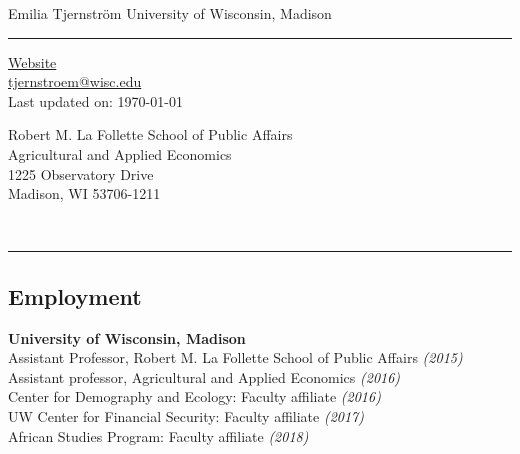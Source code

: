 \documentclass[11pt]{article}
\begin{document}
\begin{center}
\Large \sc Emilia Tjernstr\"{o}m \hfill University of Wisconsin, Madison \\
\end{center}
\vspace{-.3cm}
\noindent\rule{\textwidth}{1pt}
\parbox[t]{.45\textwidth}{\begin{flushleft}
    \vspace{-.5cm}
    \begin{footnotesize}  
    \href{https://www.lafollette.wisc.edu/sites/tjernstrom/}{Website} \\
    \href{mailto:tjernstroem@wisc.edu}{tjernstroem@wisc.edu} \\
    \vspace{.35cm}
    Last updated on: \today \\
    \end{footnotesize} 
\end{flushleft}} \hfill
\parbox[t]{.45\textwidth}{\begin{flushright}
    \begin{footnotesize}    
    \vspace{-.5cm}
    Robert M. La Follette School of Public Affairs \\
    Agricultural and Applied Economics \\
    1225 Observatory Drive \\
    Madison, WI 53706-1211 \\
    \end{footnotesize}
\end{flushright}} \\
\noindent\rule{\textwidth}{1pt}

\subsection*{\sc Employment}

\hspace{20pt}\textbf{University of Wisconsin, Madison}\\
\hspace*{27pt}Assistant Professor, Robert M. La Follette School of
Public Affairs \emph{(2015\textendash )}\\
\hspace*{27pt}Assistant professor, Agricultural and Applied Economics \emph{(2016\textendash )}\\
\hspace*{27pt}Center for Demography and Ecology: Faculty affiliate\emph{
(2016\textendash )}\\
\hspace*{27pt}UW Center for Financial Security: Faculty affiliate \emph{(2017\textendash )}\\
\hspace*{27pt}African Studies Program: Faculty affiliate \emph{(2018\textendash )}
\end{document}
